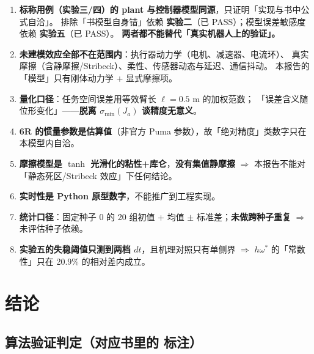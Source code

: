 \documentclass[11pt,a4paper]{ctexart}
\begin{document}
\begin{enumerate}[leftmargin=2em,itemsep=4pt]
\item \textbf{标称用例（实验三/四）的 plant 与控制器模型同源}，只证明「实现与书中公式自洽」。
  排除「书模型自身错」依赖 \textbf{实验二}（已 PASS）；模型误差敏感度依赖 \textbf{实验五}（已 PASS）。
  \textbf{两者都不能替代「真实机器人上的验证」。}
\item \textbf{未建模效应全部不在范围内}：执行器动力学（电机、减速器、电流环）、
  真实摩擦（含静摩擦/Stribeck）、柔性、传感器动态与延迟、通信抖动。
  本报告的「模型」只有刚体动力学 + 显式摩擦项。
\item \textbf{量化口径}：任务空间误差用等效臂长 $\ell=0.5$ m 的加权范数；
  「误差含义随位形变化」——\textbf{脱离 $\sigma_{\min}(J_a)$ 谈精度无意义}。
\item \textbf{6R 的惯量参数是估算值}（非官方 Puma 参数），故「绝对精度」类数字只在本模型内自洽。
\item \textbf{摩擦模型是 $\tanh$ 光滑化的粘性+库仑}，\textbf{没有集值静摩擦}
  $\Rightarrow$ 本报告不能对「静态死区/Stribeck 效应」下任何结论。
\item \textbf{实时性是 Python 原型数字}，不能推广到工程实现。
\item \textbf{统计口径}：固定种子 0 的 20 组初值 + 均值 $\pm$ 标准差；\textbf{未做跨种子重复}
  $\Rightarrow$ 未评估种子依赖。
\item \textbf{实验五的失稳阈值只测到两档 $dt$}，且机理对照只有单侧界
  $\Rightarrow$ $h\omega^*$ 的「常数性」只在 20.9\% 的相对差内成立。
\end{enumerate}

\section{结论}\label{sec:conclusion}

\subsection{算法验证判定（对应书里的 \dag{} 标注）}\label{sec:verdict}
\end{document}
